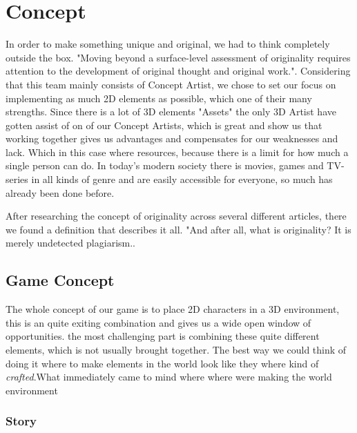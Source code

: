 \chapter{Concept}
\label{ch:kap3}
In order to make something unique and original, we had to think completely outside the box. "Moving beyond a surface-level assessment of originality requires attention to the development of original thought and original work."\cite{ConceptOfOriginality}. Considering that this team mainly consists of Concept Artist, we chose to set our focus on implementing as much 2D elements as possible, which one of their many strengths. Since there is a lot of 3D elements "Assets" the only 3D Artist have gotten assist of on of our Concept Artists, which is great and show us that working together gives us advantages and compensates for our weaknesses and lack. Which in this case where resources, because there is a limit for how much a single person can do. In today's modern society there is movies, games and TV-series in all kinds of genre and are easily accessible for everyone, so much has already been done before. 

After researching the concept of originality across several different articles, there we found a definition that describes it all. "And after all, what is originality? It is merely undetected plagiarism.\cite[p.~645]{OriginallyPlagiarism}.

\section{Game Concept}
\label{sec:GameConcept}
The whole concept of our game is to place 2D characters in a 3D environment, this is an quite exiting combination and gives us a wide open window of opportunities. the most challenging part is combining these quite different elements, which is not usually brought together. The best way we could think of doing it where to make elements in the world look like they where kind of \textit{crafted}.What immediately came to mind where where were making the world environment  

\subsection{Story}
\label{sec:story}

